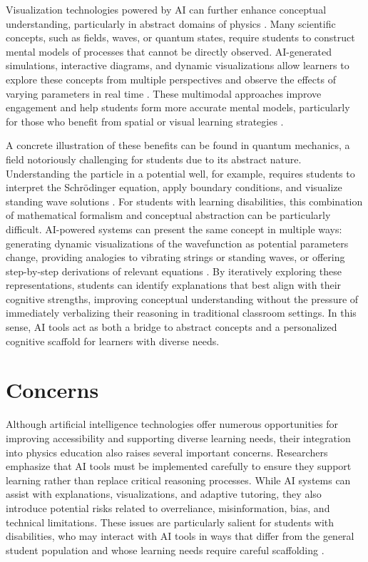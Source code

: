 \documentclass[]{aastex701}
\begin{document}
Visualization technologies powered by AI can further enhance conceptual understanding, particularly in abstract domains of physics \autocite{Liang2026}. Many scientific concepts, such as fields, waves, or quantum states, require students to construct mental models of processes that cannot be directly observed. AI-generated simulations, interactive diagrams, and dynamic visualizations allow learners to explore these concepts from multiple perspectives and observe the effects of varying parameters in real time \autocite{Voultsiou2025, HarkinsBrown2025, Liang2026}. These multimodal approaches improve engagement and help students form more accurate mental models, particularly for those who benefit from spatial or visual learning strategies \autocite{Voultsiou2025, HarkinsBrown2025}.

A concrete illustration of these benefits can be found in quantum mechanics, a field notoriously challenging for students due to its abstract nature. Understanding the particle in a potential well, for example, requires students to interpret the Schr\"{o}dinger equation, apply boundary conditions, and visualize standing wave solutions \autocite{Singh2001}. For students with learning disabilities, this combination of mathematical formalism and conceptual abstraction can be particularly difficult. AI-powered systems can present the same concept in multiple ways: generating dynamic visualizations of the wavefunction as potential parameters change, providing analogies to vibrating strings or standing waves, or offering step-by-step derivations of relevant equations \autocite{Singh2001, Finkelstein2005}. By iteratively exploring these representations, students can identify explanations that best align with their cognitive strengths, improving conceptual understanding without the pressure of immediately verbalizing their reasoning in traditional classroom settings. In this sense, AI tools act as both a bridge to abstract concepts and a personalized cognitive scaffold for learners with diverse needs.


\section{Concerns}
\label{sec:concerns}
Although artificial intelligence technologies offer numerous opportunities for improving accessibility and supporting diverse learning needs, their integration into physics education also raises several important concerns. Researchers emphasize that AI tools must be implemented carefully to ensure they support learning rather than replace critical reasoning processes. While AI systems can assist with explanations, visualizations, and adaptive tutoring, they also introduce potential risks related to overreliance, misinformation, bias, and technical limitations. These issues are particularly salient for students with disabilities, who may interact with AI tools in ways that differ from the general student population and whose learning needs require careful scaffolding \autocite{Paglialunga2025, Voultsiou2025}.
\end{document}
